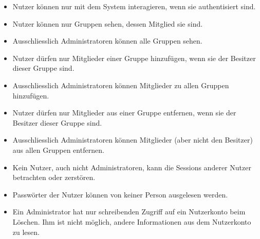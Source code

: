 \documentclass[12pt,DIV14,BCOR10mm,a4paper,parskip=half-,english,ngerman,bibliography=totocnumbered]{scrreprt}
\begin{document}
\begin{itemize}
  \item Nutzer können nur mit dem System interagieren, wenn sie authentisiert sind.
  \item Nutzer können nur Gruppen sehen, dessen Mitglied sie sind.
  \item Ausschliesslich Administratoren können alle Gruppen sehen.
  \item Nutzer dürfen nur Mitglieder einer Gruppe hinzufügen, wenn sie der Besitzer dieser Gruppe sind.
  \item Ausschliesslich Administratoren können Mitglieder zu allen Gruppen hinzufügen.
  \item Nutzer dürfen nur Mitglieder aus einer Gruppe entfernen, wenn sie der Besitzer dieser Gruppe sind.
  \item Ausschliesslich Administratoren können Mitglieder (aber nicht den Besitzer) aus allen Gruppen entfernen.
  \item Kein Nutzer, auch nicht Administratoren, kann die Sessions anderer Nutzer betrachten oder zerstören.
  \item Passwörter der Nutzer können von keiner Person ausgelesen werden.
  \item Ein Administrator hat nur schreibenden Zugriff auf ein Nutzerkonto beim Löschen. Ihm ist nicht möglich, andere Informationen aus dem Nutzerkonto zu lesen.
\end{itemize}

\clearpage

\printbibliography

\printacronyms[title=Abkürzungsverzeichnis,toctitle=Abkürzungsverzeichnis]
\printglossary[type=main]

\end{document}
